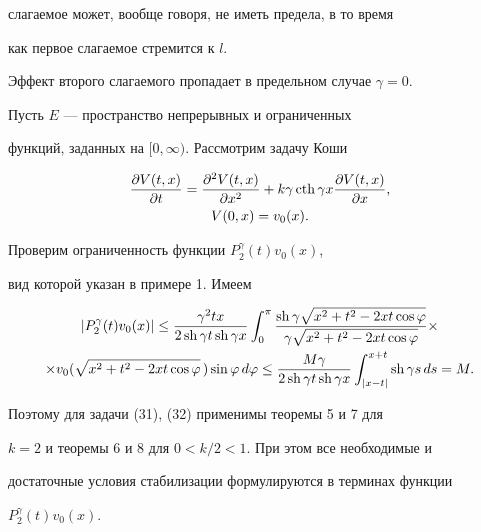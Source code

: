 слагаемое может, вообще говоря, не иметь предела, в то время


как первое слагаемое стремится к $l$.





Эффект второго слагаемого пропадает в предельном случае $\gamma=0$.





\begin{exam}


Пусть $E$ --- пространство непрерывных и ограниченных


функций, заданных на $[0,\infty)$. Рассмотрим задачу Коши


\begin{gather}


\frac{\partial V(t,x)}{ \partial t}=\frac{\partial^2 V(t,x)}{ \partial x^2}+


k\gamma\cth \gamma x \frac{\partial V(t,x)}{ \partial x},\\


V(0,x)=v_0(x).


\end{gather}


Проверим ограниченность функции $P_2^\gamma(t)v_0(x)$,


вид которой указан в примере 1. Имеем


\begin{multline*}


| P_2^\gamma(t)v_0(x) | \leq \frac{\gamma^2 tx}


{2\sh \gamma t\sh \gamma x} \int_0^\pi


\frac{\sh \gamma \sqrt{x^2+t^2-2xt \cos \varphi} }


{\gamma \sqrt{x^2+t^2-2xt \cos \varphi}} \times\\


\times v_0 (\sqrt{x^2+t^2-2xt \cos \varphi}\,)


\sin \varphi\, d\varphi \leq


\frac{M\gamma}{2\sh \gamma t\sh \gamma x}


\int_{| x-t|}^{x+t}\sh \gamma s\, ds=M.


\end{multline*}


Поэтому для задачи (31), (32) применимы теоремы 5 и 7 для


$k=2$ и теоремы 6 и 8 для $0<k/2<1$. При этом все необходимые и


достаточные условия стабилизации формулируются в терминах функции


$P_2^\gamma(t)v_0(x)$.


\end{exam}





